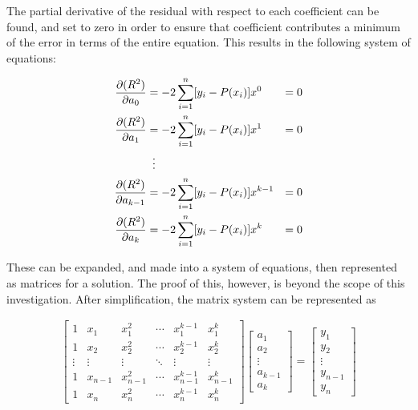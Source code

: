 \documentclass[12pt, a4paper, twoside]{article}
\begin{document}
The partial derivative of the residual with respect to each coefficient
can be found, and set to zero in order to ensure that coefficient contributes
a minimum of the error in terms of the entire equation. This results in the
following system of equations:

\begin{align*}
    \frac{\partial (R^2)}{\partial a_0}     & = -2 \sum^n_{i=1}[y_i-P(x_i)] x^0     & = 0 \\
    \frac{\partial (R^2)}{\partial a_1}     & = -2 \sum^n_{i=1}[y_i-P(x_i)] x^1     & = 0 \\
                                            & \vdotswithin{=}                             \\
    \frac{\partial (R^2)}{\partial a_{k-1}} & = -2 \sum^n_{i=1}[y_i-P(x_i)] x^{k-1} & = 0 \\
    \frac{\partial (R^2)}{\partial a_k}     & = -2 \sum^n_{i=1}[y_i-P(x_i)] x^k     & = 0
\end{align*}

These can be expanded, and made into a system of equations, then represented as
matrices for a solution. The proof of this, however, is beyond the scope of this
investigation. After simplification, the matrix system can be represented as

\begin{align*}
    \begin{bmatrix}
        1      & x_1     & x_1^2     & \cdots & x_1^{k-1}     & x_1^k     \\
        1      & x_2     & x_2^2     & \cdots & x_2^{k-1}     & x_2^k     \\
        \vdots & \vdots  & \vdots    & \ddots & \vdots        & \vdots    \\
        1      & x_{n-1} & x_{n-1}^2 & \cdots & x_{n-1}^{k-1} & x_{n-1}^k \\
        1      & x_n     & x_n^2     & \cdots & x_n^{k-1}     & x_n^k
    \end{bmatrix}
    \begin{bmatrix}
        a_1 \\ a_2 \\ \vdots \\ a_{k-1} \\ a_k
    \end{bmatrix}
    =
    \begin{bmatrix}
        y_1 \\ y_2 \\ \vdots \\ y_{n-1} \\ y_n
    \end{bmatrix}
\end{align*}
\end{document}
